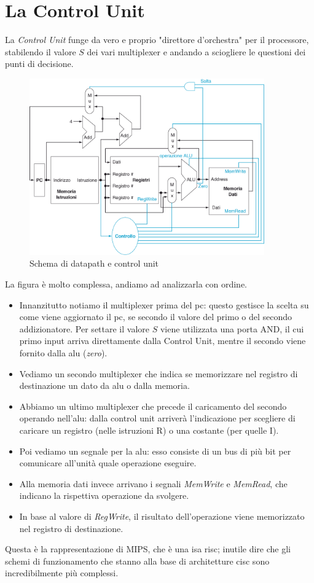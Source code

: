 \documentclass[class=book, crop=false, oneside]{standalone}
\begin{document}
\section{La Control Unit}
La \emph{Control Unit} funge da vero e proprio "direttore d'orchestra" per il processore, stabilendo il valore \(S\) dei vari multiplexer e andando a sciogliere le questioni dei punti di decisione.
\begin{figure}[H]
	\centering
	\includegraphics[width=0.9\textwidth,keepaspectratio]{datap_2}
	\caption{Schema di datapath e control unit}
\end{figure}

La figura è molto complessa, andiamo ad analizzarla con ordine.
\begin{itemize}
	\item Innanzitutto notiamo il multiplexer prima del \acrshort{pc}: questo gestisce la scelta su come viene aggiornato il \acrshort{pc}, se secondo il valore del primo o del secondo addizionatore. Per settare il valore \(S\) viene utilizzata una porta AND, il cui primo input arriva direttamente dalla Control Unit, mentre il secondo viene fornito dalla \acrshort{alu} (\emph{zero}).
	\item Vediamo un secondo multiplexer che indica se memorizzare nel registro di destinazione un dato da \acrshort{alu} o dalla memoria.
	\item Abbiamo un  ultimo multiplexer che precede il caricamento del secondo operando nell'\acrshort{alu}: dalla control unit arriverà l'indicazione per scegliere di caricare un registro (nelle istruzioni R) o una costante (per quelle I).
	\item Poi vediamo un segnale per la \acrshort{alu}: esso consiste di un bus di più bit per comunicare all'unità quale operazione eseguire.
	\item Alla memoria dati invece arrivano i segnali \emph{MemWrite} e \emph{MemRead}, che indicano la rispettiva operazione da svolgere.
	\item In base al valore di \emph{RegWrite}, il risultato dell'operazione viene memorizzato nel registro di destinazione.
\end{itemize}
Questa è la rappresentazione di MIPS, che è una \acrshort{isa} \acrshort{risc}; inutile dire che gli schemi di funzionamento che stanno alla base di architetture \acrshort{cisc} sono incredibilmente più complessi.
\end{document}
